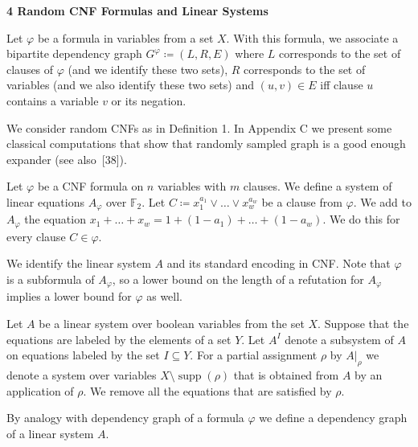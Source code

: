 \par\medskip\noindent\textbf{
4 Random CNF Formulas and Linear Systems}\par




Let $\varphi$ be a formula in variables from a set $X$. With this formula, we associate a bipartite
dependency graph $G^{\varphi}\coloneqq(L,R,E)$ where $L$ corresponds to the set of clauses of
$\varphi$ (and we identify these two sets), $R$ corresponds to the set of variables (and we also identify
these two sets) and $(u,v)\in E$ iff clause $u$ contains a variable $v$ or its negation.\par




We consider random CNFs as in Definition 1. In Appendix
C we present some classical computations that show that randomly sampled graph is a
good enough expander (see also [38]).\par




Let $\varphi$ be a CNF formula on $n$ variables with $m$ clauses. We define a system of linear equations
$A_{\varphi}$ over $\mathbb{F}_{2}$. Let $C\coloneqq x_{1}^{a_{1}}\vee\dots\vee x_{w}^{a_{w}}$ be a clause from
$\varphi$. We add to $A_{\varphi}$ the equation $x_{1}+\dots+x_{w}=1+(1-a_{1})+\dots+(1-a_{w})$. We do this for every clause $C\in\varphi$.\par




We identify the linear system $A$ and its standard encoding in CNF. Note that $\varphi$ is a
subformula of $A_{\varphi}$, so a lower bound on the length of a refutation for
$A_{\varphi}$ implies a lower bound for $\varphi$ as well.\par




Let $A$ be a linear system over boolean variables from the set $X$. Suppose that the equations are labeled by
the elements of a set $Y$. Let $A^{I}$ denote a subsystem of $A$ on
equations labeled by the set $I\subseteq Y$. For a partial assignment $\rho$ by $A|_{\rho}$ we
denote a system over variables $X\setminus\operatorname*{supp}(\rho)$ that is obtained from $A$ by an application of
$\rho$. We remove all the equations that are satisfied by $\rho$.\par




By analogy with dependency graph of a formula $\varphi$ we define a dependency graph of a linear system $A$.\par



